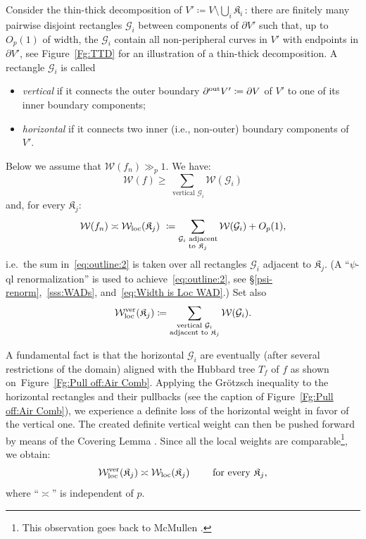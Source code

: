 \documentclass{amsart}
\newcommand{\filled}{{\mathfrak K }}
\renewcommand{\sp}{{\ \ }}
\newcommand{\1}{{\mathbb 1 }}
\newcommand{\FamG}{{\mathcal G}}
\newcommand{\Width}{{\mathcal W}}
\begin{document}
Consider the thin-thick decomposition of $V'\coloneqq V\setminus \bigcup_i \filled_i\,$: there are finitely many pairwise disjoint rectangles $\FamG_i$ between components of $\partial V'$ such that, up to $O_p(1)$ of width, the $\FamG_i$ contain all non-peripheral curves in $V'$ with endpoints in $\partial V'$, see Figure~\ref{Fg:TTD} for an illustration of a thin-thick decomposition. A rectangle $\FamG_i$ is called 
\begin{itemize}
\item \emph{vertical} if it connects the outer boundary $\partial^{\mathrm{out}} V'\coloneqq \partial V$ of $V'$ to one of its inner boundary components;
\item \emph{horizontal} if it connects two inner (i.e., non-outer) boundary components of $V'$.
\end{itemize}

Below we assume that $\Width(f_n)\gg_p 1$. We have:
\begin{equation}
\label{eq:outline:1}
\Width(f)\ge \sum_{\text{ vertical }\FamG_i} \Width(\FamG_i) 
\end{equation} 
and, for every $\filled_j$:  
\begin{equation}
\label{eq:outline:2}
\Width(f_n) \asymp  \Width_\loc(\filled_j) \  \coloneqq
\sum_{\substack{ \FamG_i \text{ adjacent}\\
        \text{to }\filled_j }}\Width(\FamG_i) +O_p(1), 
\end{equation}
i.e.~the sum in~\eqref{eq:outline:2} is taken over all rectangles
$\FamG_i$ adjacent to $\filled_j$.
(A ``$\psi$-ql renormalization''  is used to
achieve~\eqref{eq:outline:2}, see \S \ref{psi-renorm},~\ref{sss:WADs}, and~\eqref{eq:Width is Loc WAD}.) 
 Set also
\begin{equation}
\Width_\loc^\ver(\filled_j)\coloneqq \sum_{\substack{ \text{vertical }\FamG_i \\ \text{adjacent to }\filled_j   }}\Width(\FamG_i).
\end{equation}





A fundamental fact is that the horizontal $\FamG_i$ are eventually
(after several restrictions of the domain)
aligned with the Hubbard tree $T_f$ of $f$ as shown on~Figure~\ref{Fg:Pull off:Air Comb}.
Applying the Gr\"otzsch inequality to the horizontal rectangles and their pullbacks
(see the caption of Figure~\ref{Fg:Pull off:Air Comb}),
we experience a definite loss of the horizontal weight in favor of the vertical one.
The created definite vertical weight can then be pushed forward by means of the
Covering Lemma \cite{covering lemma}. Since all the local weights are comparable\footnote{This observation goes back to McMullen
  \cite[Theorem 9.3]{McM1}.}, 
we obtain:
\begin{equation}
\label{eq:outline:3}
\Width_\loc^\ver(\filled_j) \asymp \Width_\loc(\filled_j) \sp\sp\sp\text{ for every }\filled_j,
\end{equation}
where ``$\asymp$'' is independent of $p$.
\end{document}
